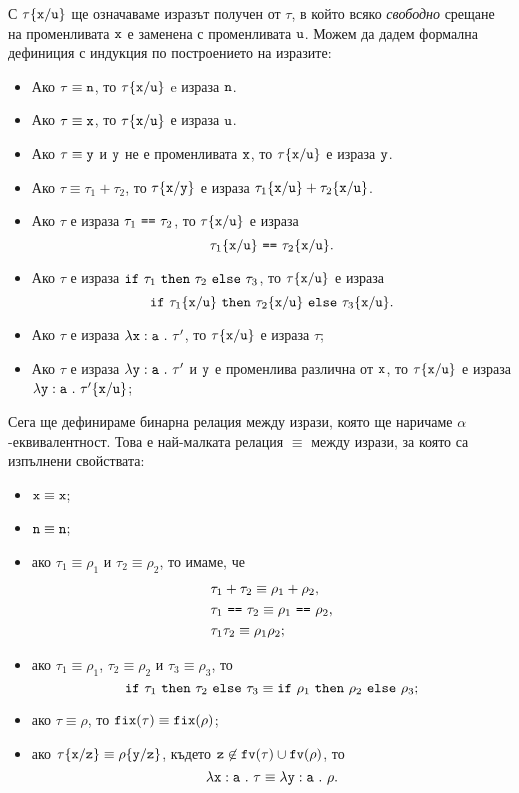 С $\tau\{\texttt{x}/\texttt{u}\}$ ще означаваме изразът получен от $\tau$, в който всяко \emph{свободно} срещане на променливата $\texttt{x}$
е заменена с променливата $\texttt{u}$. Можем да дадем формална дефиниция с индукция по построението на изразите:
\begin{itemize}
\item
  Ако $\tau \equiv \texttt{n}$, то $\tau\{\texttt{x}/\texttt{u}\}$ e израза $\texttt{n}$.
\item
  Ако $\tau \equiv \texttt{x}$, то $\tau\{\texttt{x}/\texttt{u}\}$ е израза $\texttt{u}$.
\item
  Ако $\tau \equiv \texttt{y}$ и $\texttt{y}$ не е променливата $\texttt{x}$, то $\tau\{\texttt{x}/\texttt{u}\}$ е израза $\texttt{y}$.
\item
  Ако $\tau \equiv \tau_1 + \tau_2$, то
  $\tau\{\texttt{x}/\texttt{y}\}$ е израза $\tau_1\{\texttt{x}/\texttt{u}\} + \tau_2\{\texttt{x}/\texttt{u}\}$.
\item
  Ако $\tau$ е израза $\tau_1\ \texttt{==}\ \tau_2$, то $\tau\{\texttt{x}/\texttt{u}\}$ е израза
  \[\tau_1\rename{x}{u}\ \vv{==}\ \tau_2\rename{x}{u}.\]
\item
  Ако $\tau$ е израза $\texttt{if}\ \tau_1\ \texttt{then}\ \tau_2\ \texttt{else}\ \tau_3$, то $\tau\{\texttt{x}/\texttt{u}\}$ е израза
  \[\texttt{if}\ \tau_1\{\texttt{x}/\texttt{u}\}\ \texttt{then}\ \tau_2\{\texttt{x}/\texttt{u}\}\ \texttt{else}\ \tau_3\{\texttt{x}/\texttt{u}\}.\]
\item
  Ако $\tau$ е израза $\lambda\texttt{x}:\texttt{a}\ .\ {\tau'}$, то
  $\tau\{\texttt{x}/\texttt{u}\}$ е израза $\tau$;
\item
  Ако $\tau$ е израза $\lambda\texttt{y}:\texttt{a}\ .\ {\tau'}$ и $\texttt{y}$ е променлива различна от $\texttt{x}$, то
  $\tau\{\texttt{x}/\texttt{u}\}$ е израза $\lambda\texttt{y}:\texttt{a}\ .\ {\tau'\{\texttt{x}/\texttt{u}\}}$;
\end{itemize}

Сега ще дефинираме бинарна релация между изрази, която ще наричаме $\alpha$-еквивалентност.
Това е най-малката релация $\equiv$ между изрази, за която са изпълнени свойствата:
\begin{itemize}
\item
  $\texttt{x} \equiv \texttt{x}$;
\item
  $\texttt{n} \equiv \texttt{n}$;
\item
  ако $\tau_1 \equiv \rho_1$ и $\tau_2 \equiv \rho_2$, то имаме, че
  \begin{align*}
    & \tau_1 + \tau_2 \equiv \rho_1 + \rho_2,\\
    & \tau_1\ \texttt{==}\ \tau_2 \equiv \rho_1\ \texttt{==}\ \rho_2,\\
    & \tau_1 \tau_2 \equiv \rho_1 \rho_2;
  \end{align*}
\item
  ако $\tau_1 \equiv \rho_1$, $\tau_2 \equiv \rho_2$ и $\tau_3 \equiv \rho_3$, то
  \[\texttt{if}\ \tau_1\ \texttt{then}\ \tau_2\ \texttt{else}\ \tau_3 \equiv \texttt{if}\ \rho_1\ \texttt{then}\ \rho_2\ \texttt{else}\ \rho_3;\]
\item
  ако $\tau \equiv \rho$, то $\texttt{fix}(\tau) \equiv \texttt{fix}(\rho)$;
\item
  ако $\tau\{\texttt{x}/\texttt{z}\} \equiv \rho\{\texttt{y}/\texttt{z}\}$, където $\texttt{z} \not\in \texttt{fv}(\tau) \cup \texttt{fv}(\rho)$, то
  \[\lambda\texttt{x}:\texttt{a}\ .\ {\tau} \equiv \lambda\texttt{y}:\texttt{a}\ .\ {\rho}.\]
\end{itemize}

